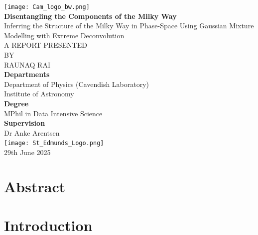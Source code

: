 \documentclass[a4paper,12pt]{article}
\begin{document}
\begin{titlepage}
    \centering
    \texttt{[image: Cam\_logo\_bw.png]}\\[1.5cm]


    {\large \bfseries Disentangling the Components of the Milky Way}\\[0.75cm]
    { \textsc Inferring the Structure of the Milky Way in Phase-Space Using Gaussian Mixture Modelling with Extreme Deconvolution}\\[1.5cm]

    \vspace{0.5cm}
    \large
    \textsc{A REPORT PRESENTED}\\[0.3cm]
    \textsc{BY}\\[0.3cm]
    \textsc{RAUNAQ RAI}\\[1cm]

    \normalsize
    \textbf{Departments}\\[0.3cm]
    Department of Physics (Cavendish Laboratory)\\
    Institute of Astronomy\\[1cm]

    \textbf{Degree}\\[0.3cm]
    MPhil in Data Intensive Science\\[1cm]

    \textbf{Supervision}\\[0.3cm]
    Dr Anke Arentsen\\

    \vfill
    \texttt{[image: St\_Edmunds\_Logo.png]}\\[0.25cm]
    29th June 2025

\end{titlepage}

\section*{Abstract}
\newpage

\tableofcontents
\newpage

\listoffigures
\newpage
\listoftables
\newpage

\section{Introduction}
\end{document}
